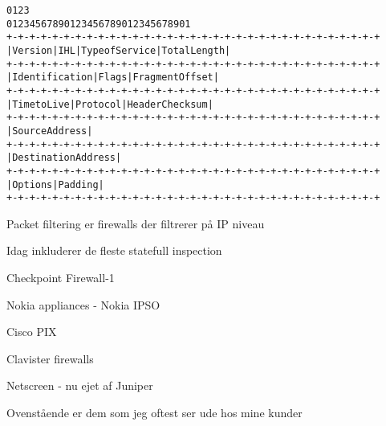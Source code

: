 
\begin{alltt}
\small
0                   1                   2                   3   
0 1 2 3 4 5 6 7 8 9 0 1 2 3 4 5 6 7 8 9 0 1 2 3 4 5 6 7 8 9 0 1 
+-+-+-+-+-+-+-+-+-+-+-+-+-+-+-+-+-+-+-+-+-+-+-+-+-+-+-+-+-+-+-+-+
|Version|  IHL  |Type of Service|          Total Length         |
+-+-+-+-+-+-+-+-+-+-+-+-+-+-+-+-+-+-+-+-+-+-+-+-+-+-+-+-+-+-+-+-+
|         Identification        |Flags|      Fragment Offset    |
+-+-+-+-+-+-+-+-+-+-+-+-+-+-+-+-+-+-+-+-+-+-+-+-+-+-+-+-+-+-+-+-+
|  Time to Live |    Protocol   |         Header Checksum       |
+-+-+-+-+-+-+-+-+-+-+-+-+-+-+-+-+-+-+-+-+-+-+-+-+-+-+-+-+-+-+-+-+
|                       Source Address                          |
+-+-+-+-+-+-+-+-+-+-+-+-+-+-+-+-+-+-+-+-+-+-+-+-+-+-+-+-+-+-+-+-+
|                    Destination Address                        |
+-+-+-+-+-+-+-+-+-+-+-+-+-+-+-+-+-+-+-+-+-+-+-+-+-+-+-+-+-+-+-+-+
|                    Options                    |    Padding    |
+-+-+-+-+-+-+-+-+-+-+-+-+-+-+-+-+-+-+-+-+-+-+-+-+-+-+-+-+-+-+-+-+  
\end{alltt}

\begin{list1}
\item Packet filtering er firewalls der filtrerer på IP niveau
\item Idag inkluderer de fleste statefull inspection 
\end{list1}

\begin{list2}
\item Checkpoint Firewall-1 
\item Nokia appliances - Nokia IPSO 
\item Cisco PIX 
\item Clavister firewalls 
\item Netscreen - nu ejet af Juniper
\end{list2}

Ovenstående er dem som jeg oftest ser ude hos mine kunder

